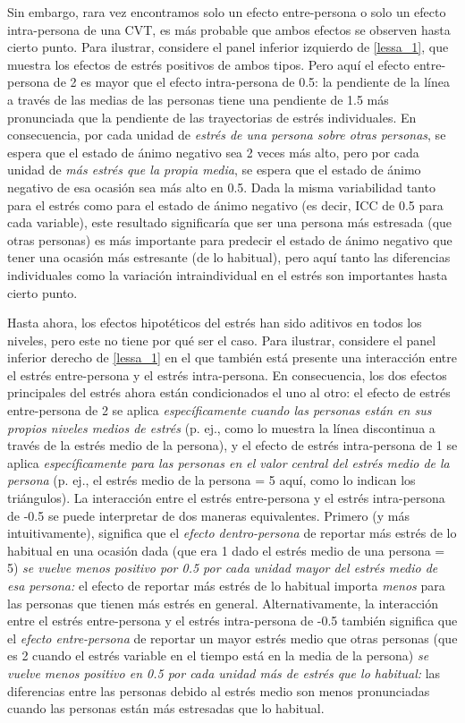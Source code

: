 \documentclass[spanish]{article}
\numberwithin{figure}{subsection}
\numberwithin{equation}{subsection}
\numberwithin{table}{subsection}
\begin{document}
Sin embargo, rara vez encontramos solo un efecto entre-persona o solo un efecto
intra-persona de una CVT, es más probable que ambos efectos se observen hasta
cierto punto. Para ilustrar, considere el panel inferior izquierdo de
\ref{lessa_1}, que muestra los efectos de estrés positivos de ambos tipos. Pero
aquí el efecto entre-persona de 2 es mayor que el efecto intra-persona de 0.5:
la pendiente de la línea a través de las medias de las personas tiene una
pendiente de 1.5 más pronunciada que la pendiente de las trayectorias de estrés
individuales. En consecuencia, por cada unidad de \textit{estrés de una persona
sobre otras personas}, se espera que el estado de ánimo negativo sea 2 veces
más alto, pero por cada unidad de \textit{más estrés que la propia media}, se
espera que el estado de ánimo negativo de esa ocasión sea más alto en 0.5. Dada
la misma variabilidad tanto para el estrés como para el estado de ánimo
negativo (es decir, ICC de 0.5 para cada variable), este resultado significaría
que ser una persona más estresada (que otras personas) es más importante para
predecir el estado de ánimo negativo que tener una ocasión más estresante (de
lo habitual), pero aquí tanto las diferencias individuales como la variación
intraindividual en el estrés son importantes hasta cierto punto.

Hasta ahora, los efectos hipotéticos del estrés han sido aditivos en todos los
niveles, pero este no tiene por qué ser el caso. Para ilustrar, considere el
panel inferior derecho de \ref{lessa_1} en el que también está presente una
interacción entre el estrés entre-persona y el estrés intra-persona. En
consecuencia, los dos efectos principales del estrés ahora están condicionados
el uno al otro: el efecto de estrés entre-persona de 2 se aplica
\textit{específicamente cuando las personas están en sus propios niveles medios
de estrés} (p. ej., como lo muestra la línea discontinua a través de la estrés
medio de la persona), y el efecto de estrés intra-persona de 1 se aplica
\textit{específicamente para las personas en el valor central del estrés medio
de la persona} (p. ej., el estrés medio de la persona = 5 aquí, como lo indican
los triángulos). La interacción entre el estrés entre-persona y el estrés
intra-persona de -0.5 se puede interpretar de dos maneras equivalentes. Primero
(y más intuitivamente), significa que el \textit{efecto dentro-persona} de
reportar más estrés de lo habitual en una ocasión dada (que era 1 dado el
estrés medio de una persona = 5) \textit{se vuelve menos positivo por 0.5 por
cada unidad mayor del estrés medio de esa persona:} el efecto de reportar más
estrés de lo habitual importa \textit{menos} para las personas que tienen más
estrés en general. Alternativamente, la interacción entre el estrés
entre-persona y el estrés intra-persona de -0.5 también significa que el
\textit{efecto entre-persona} de reportar un mayor estrés medio que otras
personas (que es 2 cuando el estrés variable en el tiempo está en la media de
la persona) \textit{se vuelve menos positivo en 0.5 por cada unidad más de
estrés que lo habitual:} las diferencias entre las personas debido al estrés
medio son menos pronunciadas cuando las personas están más estresadas que lo
habitual.
\end{document}
